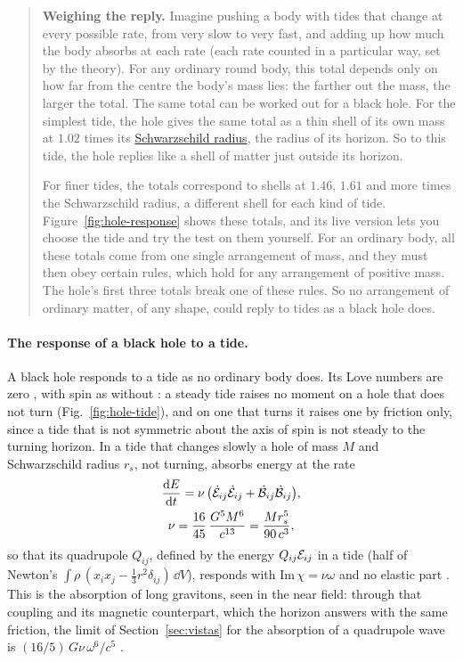 \begin{quote}
\textbf{Weighing the reply.} Imagine pushing a body with tides that change at
every possible rate, from very slow to very fast, and adding up how much the
body absorbs at each rate (each rate counted in a particular way, set by the
theory). For any ordinary round body, this total depends only on how far from
the centre the body's mass lies: the farther out the mass, the larger the
total. The same total can be worked out for a black hole. For the simplest
tide, the hole gives the same total as a thin shell of its own mass at $1.02$
times its \href{https://en.wikipedia.org/wiki/Schwarzschild_radius}{Schwarzschild
radius}, the radius of its horizon. So to this tide, the hole replies like a
shell of matter just outside its horizon.

For finer tides, the totals correspond to shells at $1.46$, $1.61$ and more
times the Schwarzschild radius, a different shell for each kind of tide. Figure~\ref{fig:hole-response} shows these totals, and its live version lets you choose the tide and try the test on them yourself. For an
ordinary body, all these totals come from one single arrangement of mass, and
they must then obey certain rules, which hold for any arrangement of positive
mass. The hole's first three totals break one of these rules. So no
arrangement of ordinary matter, of any shape, could reply to tides as a black
hole does.
\end{quote}

\paragraph{The response of a black hole to a tide.} A black hole responds to a tide as no ordinary body does.
Its Love numbers are zero \cite{BinningtonPoisson2009,DamourNagar2009}, with
spin as without \cite{CharalambousDubovskyIvanov2021}: a steady tide raises no
moment on a hole that does not turn (Fig.~\ref{fig:hole-tide}), and on one that turns it raises one by
friction only, since a tide that is not symmetric about the axis of spin is
not steady to the turning horizon. In
a tide that changes slowly a hole of mass $M$ and Schwarzschild radius $r_s$,
not turning, absorbs energy at the rate \cite{Poisson2004}
\begin{equation}\label{eq:horizon-friction}
\begin{gathered}
\frac{\mathrm{d} E}{\mathrm{d} t} = \nu\,\bigl(\dot{\mathcal{E}}_{ij}\dot{\mathcal{E}}_{ij}
+ \dot{\mathcal{B}}_{ij}\dot{\mathcal{B}}_{ij}\bigr),\\
\nu = \frac{16}{45}\,\frac{G^5M^6}{c^{13}} = \frac{M r_s^5}{90\,c^3} ,
\end{gathered}
\end{equation}
so that its quadrupole $Q_{ij}$, defined by the energy $Q_{ij}\mathcal{E}_{ij}$ in a
tide (half of Newton's $\int\rho\,(x_ix_j - \tfrac13r^2\delta_{ij})\,\dd V$),
responds with $\mathrm{Im}\,\chi = \nu\omega$ and no elastic part
\cite{GoldbergerRothstein2006}. This is the
absorption of long gravitons, seen in the near field: through that coupling
and its magnetic counterpart, which the horizon answers with the same friction,
the limit of Section~\ref{sec:vistas} for the absorption of a quadrupole wave is
$(16/5)\,G\nu\,\omega^6/c^5$ \cite{GoldbergerRothstein2020}.

